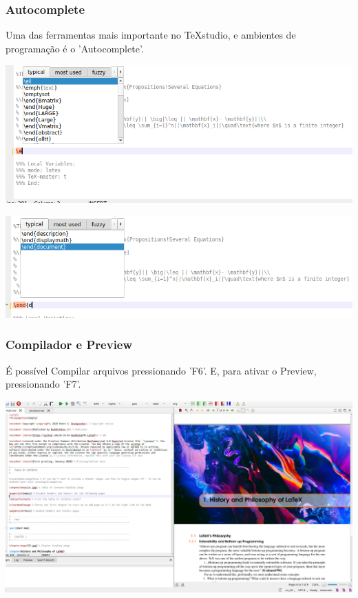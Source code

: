 \documentclass{beamer}
\begin{document}
\begin{frame}

  \frametitle{Autocomplete}
  Uma das ferramentas mais importante no TeXstudio, e ambientes de
  programação é o 'Autocomplete'.

  \begin{center}
    \includegraphics[scale=0.25]{../Imagens/Am3.png}
  \end{center}


  \begin{center}
    \includegraphics[scale=0.30]{../Imagens/Am4.png}
  \end{center}


\end{frame}



\begin{frame}

  \frametitle{Compilador e Preview}
  É possível Compilar arquivos pressionando 'F6'. E, para ativar o
  Preview, pressionando 'F7'.

  \begin{center}
    \includegraphics[scale=0.17]{../Imagens/Am6.png}
  \end{center}


\end{frame}
\end{document}
